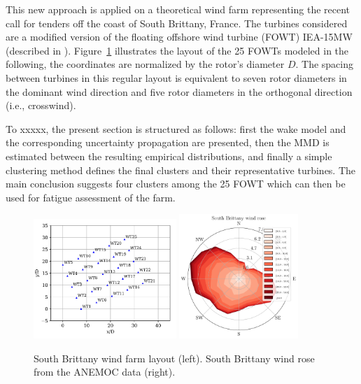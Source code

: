 This new approach is applied on a theoretical wind farm representing the recent call for tenders off the coast of South Brittany, France. 
The turbines considered are a modified version of the floating offshore wind turbine (FOWT) IEA-15MW (described in \citealp{kim_natarajan_2022}). 
Figure~\ref{fig:SB-farm} illustrates the layout of the 25 FOWTs modeled in the following, the coordinates are normalized by the rotor's diameter $D$. 
The spacing between turbines in this regular layout is equivalent to seven rotor diameters in the dominant wind direction and five rotor diameters in the orthogonal direction (i.e., crosswind). 


To xxxxx, the present section is structured as follows: 
first the wake model and the corresponding uncertainty propagation are presented, then the MMD is estimated between the resulting empirical distributions, and finally a simple clustering method defines the final clusters and their representative turbines. 
The main conclusion suggests four clusters among the 25 FOWT which can then be used for fatigue assessment of the farm.

\begin{figure}
    \centering
    \includegraphics[width=0.48\textwidth]{part2/figures/WAKE/SB1.png}
    \includegraphics[width=0.4\textwidth]{../numerical_experiments/chapter3/figures/SB_wind_rose.png}
    \caption{South Brittany wind farm layout  (left). South Brittany wind rose from the ANEMOC data (right).}
    \label{fig:SB-farm}
\end{figure}


